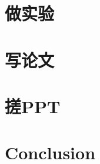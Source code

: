 \documentclass{beamer}
\begin{document}
\section{做实验}

\section{写论文}

\section{搓PPT}

\section{Conclusion}
\end{document}
